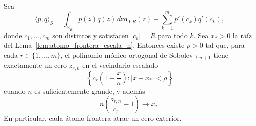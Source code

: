 \begin{thm}\label{thm:atraccion_frontera}
	Sea
	\[
		\langle p,q\rangle_S
		=
		\int_{\mathbb S_R}p(z)\overline{q(z)}\,d\mathbf m_{0;R}(z)
		+
		\sum_{k=1}^m p'(c_k)\overline{q'(c_k)},
	\]
	donde $c_1,\dots,c_m$ son distintos y satisfacen $|c_k|=R$ para todo $k$. Sea $x_*>0$ la raíz del Lema~\ref{lem:atomo_frontera_escala_n}. Entonces existe $\rho>0$ tal que, para cada $r\in\{1,\dots,m\}$, el polinomio mónico ortogonal de Sobolev $\pi_{n+1}$ tiene exactamente un cero $z_{r,n}$ en el vecindario escalado
	\[
		\left\{c_r\left(1+\frac{x}{n}\right): |x-x_*|<\rho\right\}
	\]
	cuando $n$ es suficientemente grande, y además
	\[
		n\left(\frac{z_{r,n}}{c_r}-1\right)\longrightarrow x_*.
	\]
	En particular, cada átomo frontera atrae un cero exterior.
\end{thm}

